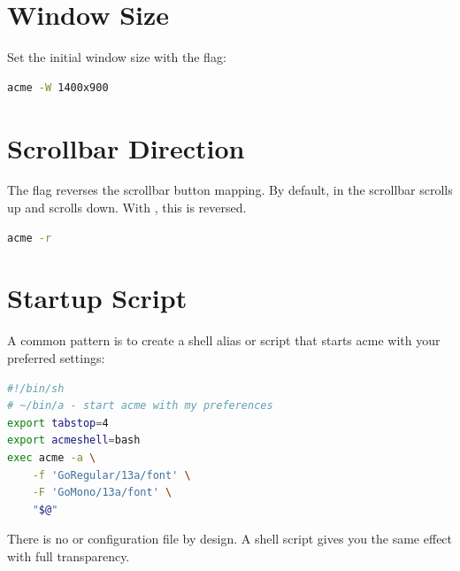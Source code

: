 \section{Window Size}
\label{sec:winsize}


Set the initial window size with the  flag:

\begin{lstlisting}[language=bash]
acme -W 1400x900
\end{lstlisting}

\section{Scrollbar Direction}
\label{sec:scrolldir}


The  flag reverses the scrollbar button mapping.  By default,
 in the scrollbar scrolls up and  scrolls down.
With , this is reversed.

\begin{lstlisting}[language=bash]
acme -r
\end{lstlisting}

\section{Startup Script}

A common pattern is to create a shell alias or script that starts acme
with your preferred settings:

\begin{lstlisting}[language=bash]
#!/bin/sh
# ~/bin/a - start acme with my preferences
export tabstop=4
export acmeshell=bash
exec acme -a \
    -f 'GoRegular/13a/font' \
    -F 'GoMono/13a/font' \
    "$@"
\end{lstlisting}

There is no  or configuration file by design.  A shell
script gives you the same effect with full transparency.
